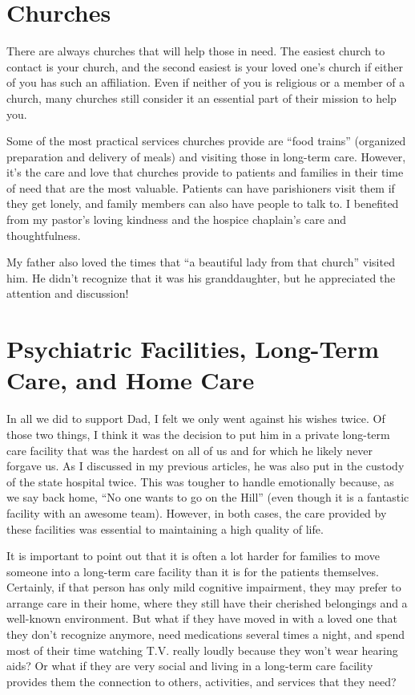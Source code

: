 \documentclass{article}
\begin{document}
\section*{Churches}

There are always churches that will help those in need. The easiest church to contact is your church, and the second easiest is your loved one's church if either of you has such an affiliation. Even if neither of you is religious or a member of a church, many churches still consider it an essential part of their mission to help you.

Some of the most practical services churches provide are ``food trains'' (organized preparation and delivery of meals) and visiting those in long-term care. However, it's the care and love that churches provide to patients and families in their time of need that are the most valuable. Patients can have parishioners visit them if they get lonely, and family members can also have people to talk to. I benefited from my pastor's loving kindness and the hospice chaplain's care and thoughtfulness.

My father also loved the times that ``a beautiful lady from that church'' visited him. He didn't recognize that it was his granddaughter, but he appreciated the attention and discussion!

\section*{Psychiatric Facilities, Long-Term Care, and Home Care}

In all we did to support Dad, I felt we only went against his wishes twice. Of those two things, I think it was the decision to put him in a private long-term care facility that was the hardest on all of us and for which he likely never forgave us. As I discussed in my previous articles, he was also put in the custody of the state hospital twice. This was tougher to handle emotionally because, as we say back home, ``No one wants to go on the Hill'' (even though it is a fantastic facility with an awesome team). However, in both cases, the care provided by these facilities was essential to maintaining a high quality of life.

It is important to point out that it is often a lot harder for families to move someone into a long-term care facility than it is for the patients themselves. Certainly, if that person has only mild cognitive impairment, they may prefer to arrange care in their home, where they still have their cherished belongings and a well-known environment. But what if they have moved in with a loved one that they don't recognize anymore, need medications several times a night, and spend most of their time watching T.V. really loudly because they won't wear hearing aids? Or what if they are very social and living in a long-term care facility provides them the connection to others, activities, and services that they need?
\end{document}
